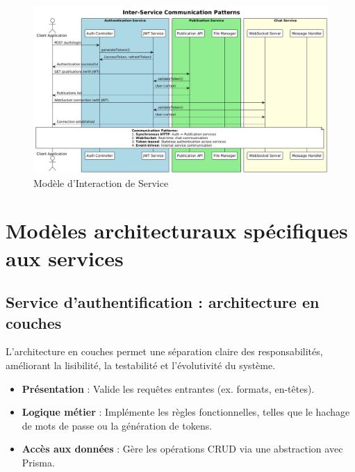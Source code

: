 \documentclass{rapportPfe}
\begin{document}
\begin{figure}[htbp]
    \centering
    \includegraphics[width=1.1\textwidth]{diagrams/diagram1.png}
    \caption{Modèle d’Interaction de Service}
    \label{fig:diagram1}
\end{figure}

\newpage
\FloatBarrier

\section{Modèles architecturaux spécifiques aux services}

\subsection{Service d’authentification : architecture en couches}
L’architecture en couches permet une séparation claire des responsabilités, améliorant la lisibilité, la testabilité et l’évolutivité du système.

\begin{itemize}[label=--]
    \item \textbf{Présentation} : Valide les requêtes entrantes (ex. formats, en-têtes).
    \item \textbf{Logique métier} : Implémente les règles fonctionnelles, telles que le hachage de mots de passe ou la génération de tokens.
    \item \textbf{Accès aux données} : Gère les opérations CRUD via une abstraction avec Prisma.
\end{itemize}
\end{document}
